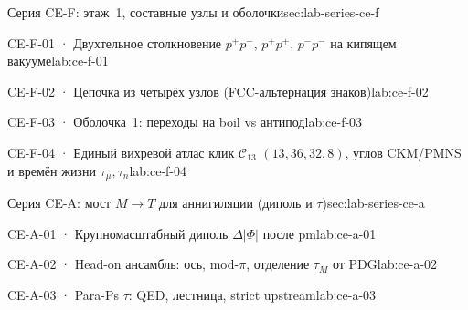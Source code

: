 
\begin{labseries}{Серия CE-F: этаж~1, составные узлы и оболочки}{sec:lab-series-ce-f}

\begin{labrecord}{CE-F-01 · Двухтельное столкновение $p^+p^-$, $p^+p^+$, $p^-p^-$ на кипящем вакууме}{lab:ce-f-01}

\end{labrecord}

\begin{labrecord}{CE-F-02 · Цепочка из четырёх узлов (FCC-альтернация знаков)}{lab:ce-f-02}

\end{labrecord}

\begin{labrecord}{CE-F-03 · Оболочка~1: переходы на boil vs антипод}{lab:ce-f-03}

\end{labrecord}

\begin{labrecord}{CE-F-04 · Единый вихревой атлас клик $\mathcal{C}_{13}$ $(13,36,32,8)$, углов CKM/PMNS и времён жизни $\tau_\mu,\tau_n$}{lab:ce-f-04}

\end{labrecord}

\end{labseries}

\begin{labseries}{Серия CE-A: мост $M\to T$ для аннигиляции (диполь и $\tau$)}{sec:lab-series-ce-a}

\begin{labrecord}{CE-A-01 · Крупномасштабный диполь $\Delta|\Phi|$ после pm}{lab:ce-a-01}

\end{labrecord}

\begin{labrecord}{CE-A-02 · Head-on ансамбль: ось, mod-$\pi$, отделение $\tau_M$ от PDG}{lab:ce-a-02}

\end{labrecord}

\begin{labrecord}{CE-A-03 · Para-Ps $\tau$: QED, лестница, strict upstream}{lab:ce-a-03}

\end{labrecord}

\end{labseries}
